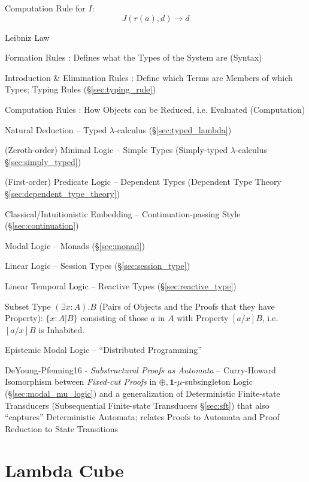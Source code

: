 Computation Rule for $I$:
\[
  J (r(a), d) \rightarrow d
\]

Leibniz Law


\asterism


Formation Rules : Defines what the Types of the System are (Syntax)

Introduction \& Elimination Rules : Define which Terms are Members of
which Types; Typing Rules (\S\ref{sec:typing_rule})

Computation Rules : How Objects can be Reduced, i.e. Evaluated
(Computation)

Natural Deduction -- Typed $\lambda$-calculus
(\S\ref{sec:typed_lambda})

(Zeroth-order) Minimal Logic -- Simple Types (Simply-typed
$\lambda$-calculus \S\ref{sec:simply_typed})

(First-order) Predicate Logic -- Dependent Types (Dependent Type
Theory \S\ref{sec:dependent_type_theory})

Classical/Intuitionistic Embedding -- Continuation-passing Style
(\S\ref{sec:continuation})

Modal Logic -- Monads (\S\ref{sec:monad})

Linear Logic -- Session Types (\S\ref{sec:session_type})

Linear Temporal Logic -- Reactive Types (\S\ref{sec:reactive_type})

Subset Type $(\exists x:A).B$ (Pairs of Objects and the Proofs that
they have Property): $\{ x : A | B \}$ consisting of those $a$ in $A$
with Property $[a/x]B$, i.e. $[a/x]B$ is Inhabited.

Epistemic Modal Logic -- ``Distributed Programming''

DeYoung-Pfenning16 - \emph{Substructural Proofs as Automata} --
Curry-Howard Isomorphism between \emph{Fixed-cut Proofs} in
$\oplus,\mathbf{1}$-$\mu$-subsingleton Logic
(\S\ref{sec:modal_mu_logic}) and a generalization of Deterministic
Finite-state Transducers (Subsequential Finite-state Transducers
\S\ref{sec:sft}) that also ``captures'' Deterministic Automata;
relates Proofs to Automata and Proof Reduction to State Transitions



\section{Lambda Cube}\label{sec:lambda_cube}

